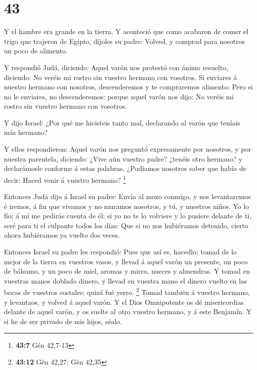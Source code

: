 \hypertarget{section-42}{%
\section{43}\label{section-42}}

 Y el hambre era grande en la tierra.  Y
aconteció que como acabaron de comer el trigo que trajeron de Egipto,
díjoles su padre: Volved, y comprad para nosotros un poco de alimento.

 Y respondió Judá, diciendo: Aquel varón nos protestó con
ánimo resuelto, diciendo: No veréis mi rostro sin vuestro hermano con
vosotros.  Si enviares á nuestro hermano con nosotros,
descenderemos y te compraremos alimento:  Pero si no le
enviares, no descenderemos: porque aquel varón nos dijo: No veréis mi
rostro sin vuestro hermano con vosotros.

 Y dijo Israel: ¿Por qué me hicisteis tanto mal, declarando
al varón que teníais más hermano?

 Y ellos respondieron: Aquel varón nos preguntó expresamente
por nosotros, y por nuestra parentela, diciendo: ¿Vive aún vuestro
padre? ¿tenéis otro hermano? y declarámosle conforme á estas palabras.
¿Podíamos nosotros saber que había de decir: Haced venir á vuestro
hermano? \footnote{\textbf{43:7} Gén 42,7-13}

 Entonces Judá dijo á Israel su padre: Envía al mozo
conmigo, y nos levantaremos é iremos, á fin que vivamos y no muramos
nosotros, y tú, y nuestros niños.  Yo lo fío; á mí me
pedirás cuenta de él: si yo no te lo volviere y lo pusiere delante de
ti, seré para ti el culpante todos los días:  Que si no nos
hubiéramos detenido, cierto ahora hubiéramos ya vuelto dos veces.

 Entonces Israel su padre les respondió: Pues que así es,
hacedlo; tomad de lo mejor de la tierra en vuestros vasos, y llevad á
aquel varón un presente, un poco de bálsamo, y un poco de miel, aromas y
mirra, nueces y almendras.  Y tomad en vuestras manos
doblado dinero, y llevad en vuestra mano el dinero vuelto en las bocas
de vuestros costales; quizá fué yerro. \footnote{\textbf{43:12} Gén
  42,27; Gén 42,35}  Tomad también á vuestro hermano, y
levantaos, y volved á aquel varón.  Y el Dios Omnipotente
os dé misericordias delante de aquel varón, y os suelte al otro vuestro
hermano, y á este Benjamín. Y si he de ser privado de mis hijos, séalo.

